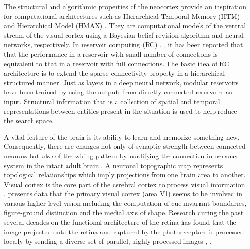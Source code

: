 \documentclass[letterpaper, 10 pt, conference]{ieeeconf}  %
\begin{document}
The structural and algorithmic properties of the neocortex \cite{schmidhuber2015deep} provide an inspiration for computational architectures such as Hierarchical Temporal Memory (HTM) \cite{Hawkins2004} and  Hierarchical Model (HMAX) \cite{Riesenhuber1999}.
They are computational models of the ventral stream of the visual cortex using a Bayesian belief revision algorithm and neural networks, respectively.
In reservoir computing (RC) \cite{Lukosevicius2009}, \cite{DeAzambuja2016a}, it has been reported that that the performance in a reservoir with small number of connections is equivalent to that in a reservoir with full connections.
The basic idea of RC architecture is to extend the sparse connectivity property in a hierarchical structured manner.
Just as layers in a deep neural network, modular reservoirs have been trained by using the outputs from directly connected reservoirs as input.
Structural information that is a collection of spatial and temporal representations between entities present in the situation is used to help reduce the search space.

A vital feature of the brain is its ability to learn and memorize something new. Consequently, there are changes not only of synaptic strength between connected neurons but also of the wiring pattern by modifying the connection  in nervous system in the intact adult brain \cite{albieri2015rapid}.
A neuronal topographic map represents topological relationships which imply projections from one brain area to another.
Visual cortex is the core part of the cerebral cortex to process visual information \cite{katzner2009local}.
\cite{lee1998role} presents data that the primary visual cortex (area V1) seems to be involved in various higher level vision including the computation of cue-invariant boundaries, figure-ground distinction and the medial axis of shape.
Research during the past several decades on the functional architecture of the retina has found that the image projected onto the retina and captured by the photoreceptors is processed locally by sending a diverse set of parallel, highly processed images \cite{roska2014retina}, \cite{Sanes2015}.
\end{document}
